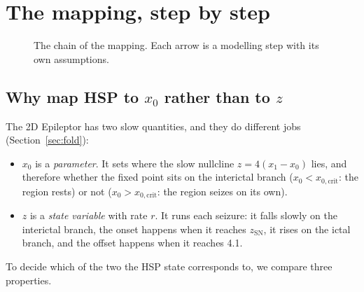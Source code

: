 \documentclass[11pt]{article}
\newcommand{\kA}{k_A}
\newcommand{\kG}{k_G}
\newcommand{\xc}{x_{0,\mathrm{crit}}}
\newcommand{\zsn}{z_{\mathrm{SN}}}
\newcommand{\xh}{x_0^{\mathrm{HSP}}}
\begin{document}
\section{The mapping, step by step}
\begin{figure}[H]\centering
{}
\caption{The chain of the mapping. Each arrow is a modelling step with its own assumptions.}
\end{figure}

\subsection{Why map HSP to $x_0$ rather than to $z$}
The 2D Epileptor has two slow quantities, and they do different jobs (Section~\ref{sec:fold}):
\begin{itemize}
\item $x_0$ is a \emph{parameter}. It sets where the slow nullcline $z=4(x_1-x_0)$ lies, and therefore whether the
fixed point sits on the interictal branch ($x_0<\xc$: the region rests) or not ($x_0>\xc$: the region seizes on its own).
\item $z$ is a \emph{state variable} with rate $r$. It runs each seizure: it falls slowly on the interictal branch, the
onset happens when it reaches $\zsn$, it rises on the ictal branch, and the offset happens when it reaches 4.1.
\end{itemize}
To decide which of the two the HSP state corresponds to, we compare three properties.
\end{document}
